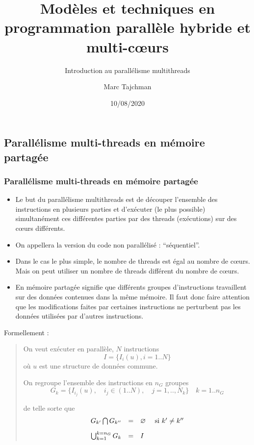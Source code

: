 \documentclass{beamer}
\title{Modèles et techniques en programmation parallèle hybride et multi-c\oe urs}
\subtitle{Introduction au parall\'elisme multithreads}
\author{Marc Tajchman}\institute{CEA - DEN/DM2S/STMF/LMES}
\date{10/08/2020}
\begin{document}
\begin{frame}
	\titlepage
\end{frame}

\large
\begin{frame}
	\section{Parallélisme multi-threads en mémoire partagée}
	\frametitle{Parallélisme multi-threads en mémoire partagée}

\begin{itemize}
	\item 
	Le but du parallélisme multithreads est de découper l'ensemble des instructions en plusieurs parties et d'exécuter (le plus possible) simultanément ces différentes parties par des threads (exécutions) sur des c\oe urs différents.
	\item 
	On appellera la version du code non parallélisé : ``séquentiel''.
	\item 
    Dans le cas le plus simple, le nombre de threads est égal au nombre de c\oe urs. Mais on peut utiliser un nombre de threads différent du nombre de c\oe urs.
	\item 
	En mémoire partagée signifie que différents groupes d'instructions travaillent sur des données contenues dans la même mémoire. Il faut donc faire attention que les modifications faites par certaines instructions ne perturbent pas les données utilisées par d'autres instructions.
\end{itemize}
\end{frame}

\begin{frame}[fragile]
	Formellement :
	
	\bigskip
	\begin{quote}
On veut exécuter en parallèle, $N$ instructions 
$$
I = \{ I_i(u), i=1 .. N\}
$$ 
où $u$ est une structure de données commune.

\bigskip
On regroupe l'ensemble des instructions en $n_G$ groupes 
$$
G_k = \{ I_{i_j}(u),\quad i_j \in (1..N),\quad j=1,..,N_k\} \quad k = 1 .. n_G
$$

de telle sorte que
$$
\begin{array}{rcl}
G_{k'} \bigcap G_{k''} &=& \varnothing\quad \hbox{ si } k' \neq k'' \\[0.3cm]
\bigcup_{k=1}^{k=n_G} G_k &=& I
\end{array}
$$ 
\end{quote}
	
\end{frame}
\end{document}
